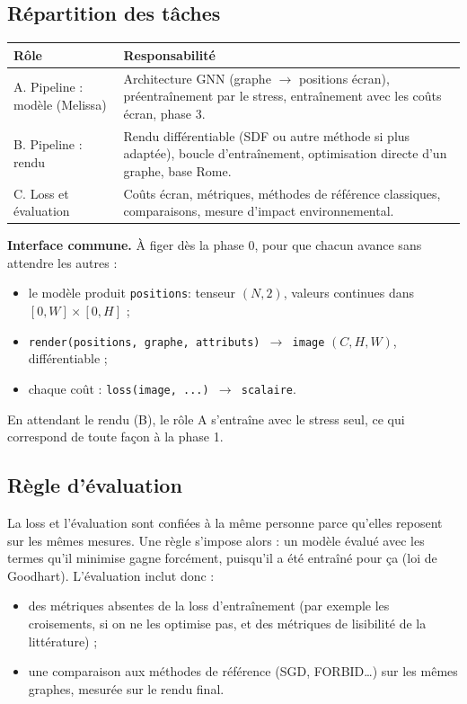 \documentclass[11pt,a4paper]{article}
\begin{document}
\subsection{Répartition des tâches}

\begin{center}
\small
\begin{tabularx}{\linewidth}{lX}
\toprule
\textbf{Rôle} & \textbf{Responsabilité} \\
\midrule
A. Pipeline : modèle (Melissa) & Architecture GNN (graphe $\to$ positions écran), préentraînement par le stress, entraînement avec les coûts écran, phase 3. \\
B. Pipeline : rendu & Rendu différentiable (SDF ou autre méthode si plus adaptée), boucle d'entraînement, optimisation directe d'un graphe, base Rome. \\
C. Loss et évaluation & Coûts écran, métriques, méthodes de référence classiques, comparaisons, mesure d'impact environnemental. \\
\bottomrule
\end{tabularx}
\end{center}

\textbf{Interface commune.} À figer dès la phase 0, pour que chacun avance sans attendre les autres :
\begin{itemize}
  \item le modèle produit \texttt{positions}: tenseur $(N,2)$, valeurs continues dans $[0,W]\times[0,H]$ ;
  \item \texttt{render(positions, graphe, attributs) $\to$ image} $(C,H,W)$, différentiable ;
  \item chaque coût : \texttt{loss(image, ...) $\to$ scalaire}.
\end{itemize}
En attendant le rendu (B), le rôle A s'entraîne avec le stress seul, ce qui correspond de toute façon à la phase 1.

\subsection{Règle d'évaluation}\label{sec:eval}

La loss et l'évaluation sont confiées à la même personne parce qu'elles reposent sur les mêmes mesures. Une règle s'impose alors : un modèle évalué avec les termes qu'il minimise gagne forcément, puisqu'il a été entraîné pour ça (loi de Goodhart). L'évaluation inclut donc :
\begin{itemize}
  \item des métriques absentes de la loss d'entraînement (par exemple les croisements, si on ne les optimise pas, et des métriques de lisibilité de la littérature) ;
  \item une comparaison aux méthodes de référence (SGD, FORBID\ldots) sur les mêmes graphes, mesurée sur le rendu final.
\end{itemize}
\end{document}
